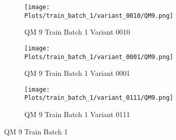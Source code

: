 \documentclass{DissertateFigs}
\begin{document}
\begin{figure}[t!]
\medskip

    \begin{subfigure}{0.47\textwidth}
    \texttt{[image: Plots/train\_batch\_1/variant\_0010/QM9.png]}
    \caption{QM 9 Train Batch 1 Variant 0010}
    \end{subfigure}
    \begin{subfigure}{0.47\textwidth}
    \texttt{[image: Plots/train\_batch\_1/variant\_0001/QM9.png]}
    \caption{QM 9 Train Batch 1 Variant 0001}
    \end{subfigure}

\medskip

    \begin{subfigure}{0.47\textwidth}
    \texttt{[image: Plots/train\_batch\_1/variant\_0111/QM9.png]}
    \caption{QM 9 Train Batch 1 Variant 0111}
    \end{subfigure}
\caption{QM 9 Train Batch 1}
    \end{figure}
\clearpage
\end{document}
